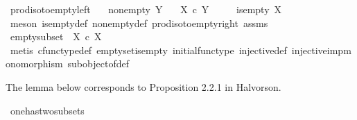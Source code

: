 \begin{isabellebody}
\endisatagproof
{\isafoldproof}%
%
\isadelimproof
\isanewline
%
\endisadelimproof
\isanewline
{}\isamarkupfalse%
\ prod{\isacharunderscore}{\kern0pt}iso{\isacharunderscore}{\kern0pt}to{\isacharunderscore}{\kern0pt}empty{\isacharunderscore}{\kern0pt}left{\isacharcolon}{\kern0pt}\isanewline
\ \ \ {\isachardoublequoteopen}nonempty\ Y{\isachardoublequoteclose}\isanewline
\ \ \ {\isachardoublequoteopen}X\ {\isasymtimes}\isactrlsub c\ Y\ {\isasymcong}\ {\isasymemptyset}{\isachardoublequoteclose}\isanewline
\ \ \ {\isachardoublequoteopen}is{\isacharunderscore}{\kern0pt}empty\ X{\isachardoublequoteclose}\isanewline
%
\isadelimproof
\ \ %
\endisadelimproof
%
\isatagproof
{}\isamarkupfalse%
\ {\isacharparenleft}{\kern0pt}meson\ is{\isacharunderscore}{\kern0pt}empty{\isacharunderscore}{\kern0pt}def\ nonempty{\isacharunderscore}{\kern0pt}def\ prod{\isacharunderscore}{\kern0pt}iso{\isacharunderscore}{\kern0pt}to{\isacharunderscore}{\kern0pt}empty{\isacharunderscore}{\kern0pt}right\ assms{\isacharparenright}{\kern0pt}%
\endisatagproof
{\isafoldproof}%
%
\isadelimproof
\isanewline
%
\endisadelimproof
\isanewline
{}\isamarkupfalse%
\ empty{\isacharunderscore}{\kern0pt}subset{\isacharcolon}{\kern0pt}\ {\isachardoublequoteopen}{\isacharparenleft}{\kern0pt}{\isasymemptyset}{\isacharcomma}{\kern0pt}\ {\isasymalpha}\isactrlbsub X\isactrlesub {\isacharparenright}{\kern0pt}\ {\isasymsubseteq}\isactrlsub c\ X{\isachardoublequoteclose}\isanewline
%
\isadelimproof
\ \ %
\endisadelimproof
%
\isatagproof
{}\isamarkupfalse%
\ {\isacharparenleft}{\kern0pt}metis\ cfunc{\isacharunderscore}{\kern0pt}type{\isacharunderscore}{\kern0pt}def\ emptyset{\isacharunderscore}{\kern0pt}is{\isacharunderscore}{\kern0pt}empty\ initial{\isacharunderscore}{\kern0pt}func{\isacharunderscore}{\kern0pt}type\ injective{\isacharunderscore}{\kern0pt}def\ injective{\isacharunderscore}{\kern0pt}imp{\isacharunderscore}{\kern0pt}monomorphism\ subobject{\isacharunderscore}{\kern0pt}of{\isacharunderscore}{\kern0pt}def{}{\isacharparenright}{\kern0pt}%
\endisatagproof
{\isafoldproof}%
%
\isadelimproof
%
\endisadelimproof
%
\begin{isamarkuptext}%
The lemma below corresponds to Proposition 2.2.1 in Halvorson.%
\end{isamarkuptext}\isamarkuptrue%
\isamarkupfalse%
\ one{\isacharunderscore}{\kern0pt}has{\isacharunderscore}{\kern0pt}two{\isacharunderscore}{\kern0pt}subsets{\isacharcolon}{\kern0pt}\isanewline

\end{isabellebody}
